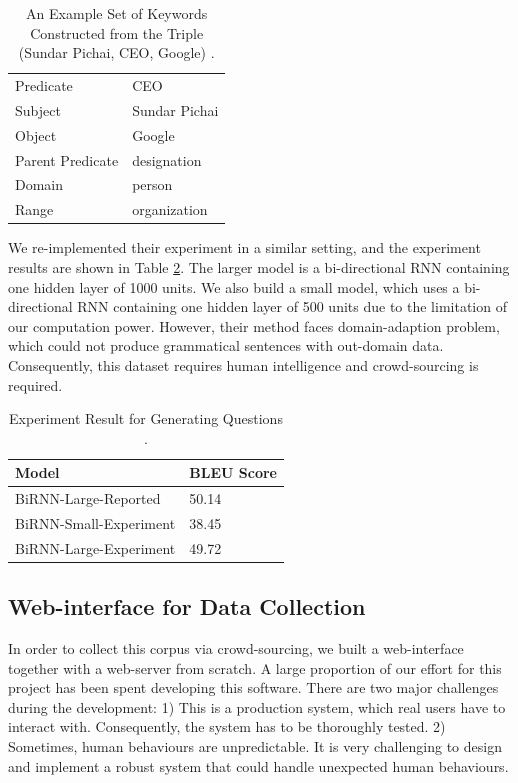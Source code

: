 \documentclass[bsc,frontabs,twoside,singlespacing,parskip,deptreport]{infthesis}     %
\begin{document}
\begin{table}[]
\centering
\begin{tabular}{|l|l|}
\hline
Predicate        & CEO           \\
Subject          & Sundar Pichai \\
Object           & Google        \\
Parent Predicate & designation   \\
Domain           & person        \\
Range            & organization  \\ \hline
\end{tabular}
\caption{An Example Set of Keywords Constructed from the Triple (Sundar Pichai, CEO, Google) \cite{indurthi2017generating}.}
\label{tab:keyword}
\end{table}

We re-implemented their experiment in a similar setting, and the experiment results are shown in Table \ref{tab:genresult}. The larger model is a bi-directional RNN containing one hidden layer of 1000 units. We also build a small model, which uses a bi-directional RNN containing one hidden layer of 500 units due to the limitation of our computation power. However, their method faces domain-adaption problem, which could not produce grammatical sentences with out-domain data. Consequently, this dataset requires human intelligence and crowd-sourcing is required. 

\begin{table}[]
\centering
\begin{tabular}{|l|l|}
\hline
Model                  & BLEU Score \\ \hline
BiRNN-Large-Reported   & 50.14      \\ \hline
BiRNN-Small-Experiment & 38.45      \\ \hline
BiRNN-Large-Experiment & 49.72      \\ \hline
\end{tabular}
\caption{Experiment Result for Generating Questions \cite{indurthi2017generating}.}
\label{tab:genresult}
\end{table}

\subsection{Web-interface for Data Collection}

In order to collect this corpus via crowd-sourcing, we built a web-interface together with a web-server from scratch. A large proportion of our effort for this project has been spent developing this software. There are two major challenges during the development: 1) This is a production system, which real users have to interact with. Consequently, the system has to be thoroughly tested. 2) Sometimes, human behaviours are unpredictable. It is very challenging to design and implement a robust system that could handle unexpected human behaviours.
\end{document}
